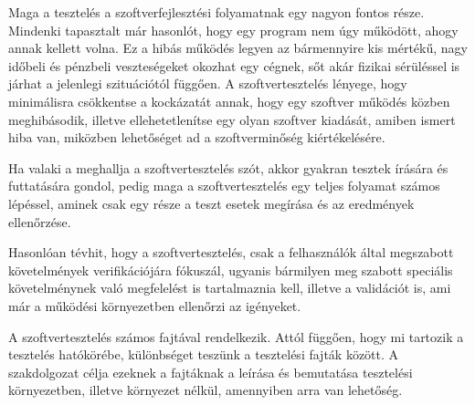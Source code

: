 


Maga a tesztelés a szoftverfejlesztési folyamatnak egy nagyon fontos része. Mindenki tapasztalt már hasonlót, hogy egy program nem úgy működött, ahogy annak kellett volna. Ez a hibás működés legyen az bármennyire kis mértékű, nagy időbeli és pénzbeli veszteségeket okozhat egy cégnek, sőt akár fizikai sérüléssel is járhat a jelenlegi szituációtól függően. A szoftvertesztelés lényege, hogy minimálisra csökkentse a kockázatát annak, hogy egy szoftver működés közben meghibásodik, illetve ellehetetlenítse egy olyan szoftver kiadását, amiben ismert hiba van, miközben lehetőséget ad a szoftverminőség kiértékelésére.

Ha valaki a meghallja a szoftvertesztelés szót, akkor gyakran tesztek írására és futtatására gondol, pedig maga a szoftvertesztelés egy teljes folyamat számos lépéssel, aminek csak egy része a teszt esetek megírása és az eredmények ellenőrzése.

Hasonlóan tévhit, hogy a szoftvertesztelés, csak a felhasználók által megszabott követelmények verifikációjára fókuszál, ugyanis bármilyen meg szabott speciális követelménynek való megfelelést is tartalmaznia kell, illetve a validációt is, ami már a működési környezetben ellenőrzi az igényeket.

A szoftvertesztelés számos fajtával rendelkezik. Attól függően, hogy mi tartozik a tesztelés hatókörébe, különbséget teszünk a tesztelési fajták között. A szakdolgozat célja ezeknek a fajtáknak a leírása és bemutatása tesztelési környezetben, illetve környezet nélkül, amennyiben arra van lehetőség.
